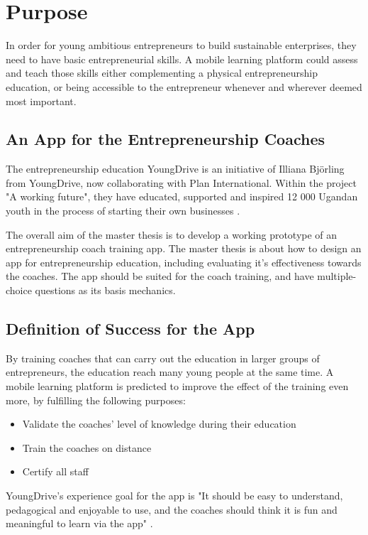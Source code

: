 \section{Purpose}
\label{purpose}

In order for young ambitious entrepreneurs to build sustainable enterprises, they need to have basic entrepreneurial skills. A mobile learning platform could assess and teach those skills either complementing a physical entrepreneurship education, or being accessible to the entrepreneur whenever and wherever deemed most important.

\subsection{An App for the Entrepreneurship Coaches}
The entrepreneurship education YoungDrive is an initiative of Illiana Björling from YoungDrive, now collaborating with Plan International. Within the project "A working future", they have educated, supported and inspired 12 000 Ugandan youth in the process of starting their own businesses \citep{nissar}.

The overall aim of the master thesis is to develop a working prototype of an entrepreneurship coach training app. The master thesis is about how to design an app for entrepreneurship education, including evaluating it's effectiveness towards the coaches. The app should be suited for the coach training, and have multiple-choice questions as its basis mechanics.

\subsection{Definition of Success for the App}\label{sec:definitionofsuccess}

By training coaches that can carry out the education in larger groups of entrepreneurs, the education reach many young people at the same time. A mobile learning platform is predicted to improve the effect of the training even more, by fulfilling the following purposes:

\begin{itemize}
  \item Validate the coaches' level of knowledge during their education
    \item Train the coaches on distance
    \item Certify all staff
\end{itemize}

YoungDrive's experience goal for the app is "It should be easy to understand, pedagogical and enjoyable to use, and the coaches should think it is fun and meaningful to learn via the app" \citep{youngdrive-masterthesis-idea}.
